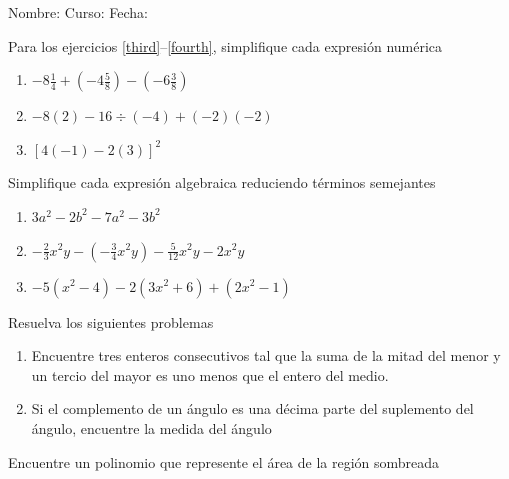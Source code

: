 \documentclass[letterpaper,fleqn]{article}
\newcommand{\LineaNombre}{%
\par
\vspace{\baselineskip}
Nombre:\hrulefill \; Curso: \underline{\hspace*{48pt}} \; Fecha: \underline{\hspace*{2.5cm}} \relax
\par}
\begin{document}
\LineaNombre
\begin{enumerate}
 \item Para los ejercicios \ref{third}--\ref{fourth}, simplifique cada expresión numérica
 \begin{enumerate}
 \item $-8\frac{1}{4}+\left(-4\frac{5}{8}\right)-\left(-6\frac{3}{8}\right)$\label{third}\noanswer
\item $-8(2)-16\div (-4)+(-2)(-2)$\noanswer
\item  $[4(-1)-2(3)]^{2}$\label{fourth}\noanswer
 \end{enumerate}
 \item Simplifique cada expresi\'{o}n algebraica reduciendo términos semejantes
 \begin{enumerate}
 \item $3a^{2}-2b^{2}-7a^{2}-3b^{2}$\noanswer
\item $-\frac{2}{3}x^{2}y-\left(-\frac{3}{4}x^{2}y\right)-\frac{5}{12}x^{2}y-2x^{2}y$\noanswer
\item $-5(x^{2}-4)-2(3x^{2}+6)+(2x^{2}-1)$\noanswer
 \end{enumerate}
 \item Resuelva los siguientes problemas
 \begin{enumerate}
 \item Encuentre tres enteros consecutivos tal que la suma de la mitad del menor y un tercio del mayor es uno menos que el entero del medio.\noanswer
 \item Si el complemento de un ángulo es una d\'{e}cima parte del suplemento del \'{a}ngulo, encuentre la medida del \'{a}ngulo\noanswer
 \end{enumerate}
 \begin{minipage}{.45\textwidth}
\item Encuentre un polinomio que represente el área de la región sombreada
\end{minipage}\hfill
\begin{minipage}{.45\textwidth}

\end{minipage}
\end{enumerate}
\end{document}
